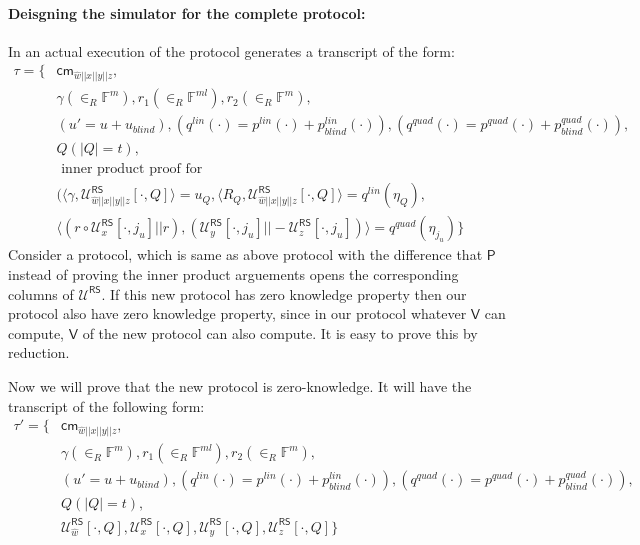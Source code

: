 \documentclass[runningheads]{llncs}
\newcommand{\innp}[2]{\langle #1,#2\rangle}
\def\prover{\mathsf{P}}
\def\verifier{\mathsf{V}}
\def\RS{\mathsf{RS}} %
\def\cm{\mathsf{cm}} %
\def\extwit{\hat{w}} %
\def\oracle{\mathcal{U}^{\RS}}
\def\bbF{\mathbb{F}}
\begin{document}
	\paragraph{Deisgning the simulator for the complete protocol: } In an actual execution of the protocol generates a transcript of the form:
	\begin{align*}
		\tau = \{ 
				& \cm_{\extwit||x||y||z},\\
				& \gamma(\in_R \bbF^{m}), r_1(\in_R \bbF^{ml}), r_2(\in_R \bbF^m), \\ 
				& (u' = u+u_{blind}), (q^{lin}(\cdot) = p^{lin}(\cdot)+p^{lin}_{blind}(\cdot)), (q^{quad}(\cdot) = p^{quad}(\cdot) + p^{quad}_{blind}(\cdot)),\\
				& Q (|Q|=t),\\
				& \text{ inner product proof for } \\
				& (\innp{\gamma}{\oracle_{\extwit||x||y||z}[\cdot, Q]} = u_Q, \innp{R_Q}{\oracle_{\extwit||x||y||z}[\cdot, Q]}=q^{lin}(\eta_Q),\\
				& \innp{(r\circ \oracle_x[\cdot,j_u]||r)}{(\oracle_y[\cdot,j_u]||-\oracle_z[\cdot,j_u])} = q^{quad}(\eta_{j_u})
			\}
	\end{align*}
	Consider a protocol, which is same as above protocol with the difference that $\prover$ instead of proving the inner product arguements opens the corresponding columns of $\oracle$. If this new protocol has zero knowledge property then our protocol also have zero knowledge property, since in our protocol whatever $\verifier$ can compute, $\verifier$ of the new protocol can also compute. It is easy to prove this by reduction.
	
	Now we will prove that the new protocol is zero-knowledge. It will have the transcript of the following form:
	\begin{align*}
	\tau' = \{
	& \cm_{\extwit||x||y||z},\\
	& \gamma(\in_R \bbF^{m}), r_1(\in_R \bbF^{ml}), r_2(\in_R \bbF^m), \\ 
	& (u' = u+u_{blind}), (q^{lin}(\cdot) = p^{lin}(\cdot)+p^{lin}_{blind}(\cdot)), (q^{quad}(\cdot) = p^{quad}(\cdot) + p^{quad}_{blind}(\cdot)),\\
	& Q (|Q|=t),\\
	& \oracle_{\extwit}[\cdot, Q], \oracle_{x}[\cdot, Q], \oracle_{y}[\cdot, Q], \oracle_{z}[\cdot, Q]
	 \}
	\end{align*}
	
\end{document}
